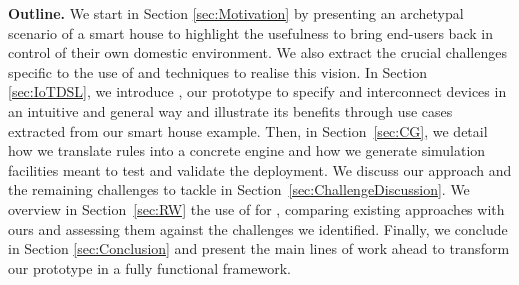 \noindent
\textbf{Outline.} We start in Section \ref{sec:Motivation} by presenting an archetypal scenario of a smart house to highlight the usefulness to bring end-users back in control of their own domestic \IOT environment. We also extract the crucial \IOT challenges specific to the use of \DSLS and \MDE techniques to realise this vision. In Section \ref{sec:IoTDSL}, we introduce \IOTDSL, our prototype \DSL to specify and interconnect devices in an intuitive and general way and illustrate its benefits through use cases extracted from our smart house example. Then, in Section~\ref{sec:CG}, we detail how we translate \IOTDSL rules into a concrete \CEP engine and how we generate simulation facilities meant to test and validate the \IOT deployment. We discuss our approach and the remaining challenges to tackle in Section~\ref{sec:ChallengeDiscussion}. We overview in Section~\ref{sec:RW} the use of \DSLS for \IOT, comparing existing approaches with ours and assessing them against the challenges we identified. Finally, we conclude in Section \ref{sec:Conclusion} and present the main lines of work ahead to transform our prototype in a fully functional \DSL framework.
